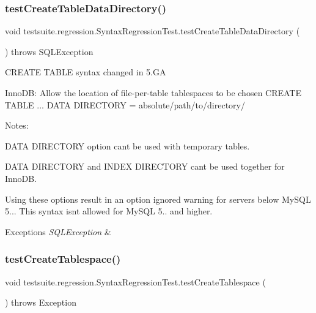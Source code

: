 \subsubsection{\texorpdfstring{test\+Create\+Table\+Data\+Directory()}{testCreateTableDataDirectory()}}
{\footnotesize\ttfamily void testsuite.\+regression.\+Syntax\+Regression\+Test.\+test\+Create\+Table\+Data\+Directory (\begin{DoxyParamCaption}{ }\end{DoxyParamCaption}) throws S\+Q\+L\+Exception}

C\+R\+E\+A\+TE T\+A\+B\+LE syntax changed in 5.\+GA

Inno\+DB\+: Allow the location of file-\/per-\/table tablespaces to be chosen C\+R\+E\+A\+TE T\+A\+B\+LE ... D\+A\+TA D\+I\+R\+E\+C\+T\+O\+RY = \textquotesingle{}absolute/path/to/directory/\textquotesingle{}

Notes\+:
\begin{DoxyItemize}
\item D\+A\+TA D\+I\+R\+E\+C\+T\+O\+RY option can\textquotesingle{}t be used with temporary tables.
\item D\+A\+TA D\+I\+R\+E\+C\+T\+O\+RY and I\+N\+D\+EX D\+I\+R\+E\+C\+T\+O\+RY can\textquotesingle{}t be used together for Inno\+DB.
\item Using these options result in an \textquotesingle{}option ignored\textquotesingle{} warning for servers below My\+S\+QL 5... This syntax isn\textquotesingle{}t allowed for My\+S\+QL 5.. and higher.
\end{DoxyItemize}


\begin{DoxyExceptions}{Exceptions}
{\em S\+Q\+L\+Exception} & \\
\hline
\end{DoxyExceptions}
\mbox{\label{classtestsuite_1_1regression_1_1_syntax_regression_test_ad1acd7d881976285b80df9ddb0a44558}} 
\subsubsection{\texorpdfstring{test\+Create\+Tablespace()}{testCreateTablespace()}}
{\footnotesize\ttfamily void testsuite.\+regression.\+Syntax\+Regression\+Test.\+test\+Create\+Tablespace (\begin{DoxyParamCaption}{ }\end{DoxyParamCaption}) throws Exception}

